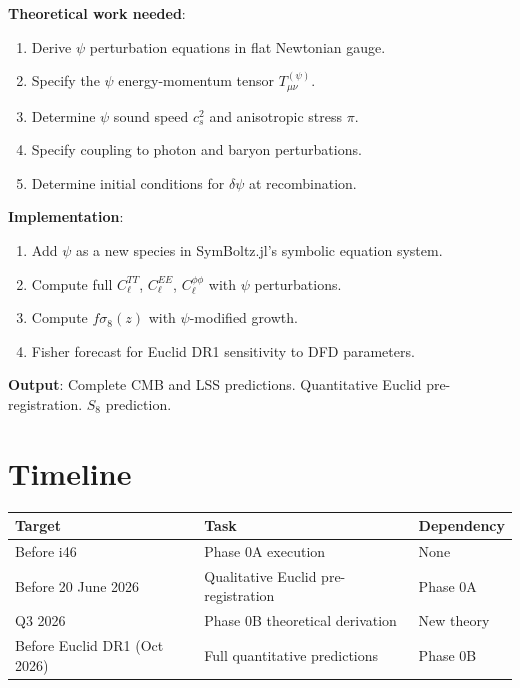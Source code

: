 \documentclass[11pt,a4paper]{article}
\begin{document}
\begin{tcolorbox}[colback=yellow!5!white, colframe=yellow!60!black,
  title={Phase 0B: Full Perturbation Theory for $\psi$ (Weeks--Months)}]
\textbf{Theoretical work needed}:
\begin{enumerate}
\item Derive $\psi$ perturbation equations in flat Newtonian gauge.
\item Specify the $\psi$ energy-momentum tensor $T_{\mu\nu}^{(\psi)}$.
\item Determine $\psi$ sound speed $c_s^2$ and anisotropic stress $\pi$.
\item Specify coupling to photon and baryon perturbations.
\item Determine initial conditions for $\delta\psi$ at recombination.
\end{enumerate}

\textbf{Implementation}:
\begin{enumerate}
\item Add $\psi$ as a new species in SymBoltz.jl's symbolic equation system.
\item Compute full $C_\ell^{TT}$, $C_\ell^{EE}$, $C_\ell^{\phi\phi}$ with $\psi$ perturbations.
\item Compute $f\sigma_8(z)$ with $\psi$-modified growth.
\item Fisher forecast for Euclid DR1 sensitivity to DFD parameters.
\end{enumerate}

\textbf{Output}: Complete CMB and LSS predictions. Quantitative Euclid pre-registration. $S_8$ prediction.
\end{tcolorbox}

\section{Timeline}

\begin{center}
\begin{tabular}{lll}
\toprule
\textbf{Target} & \textbf{Task} & \textbf{Dependency} \\
\midrule
Before i46 & Phase 0A execution & None \\
Before 20 June 2026 & Qualitative Euclid pre-registration & Phase 0A \\
Q3 2026 & Phase 0B theoretical derivation & New theory \\
Before Euclid DR1 (Oct 2026) & Full quantitative predictions & Phase 0B \\
\bottomrule
\end{tabular}
\end{center}
\end{document}
